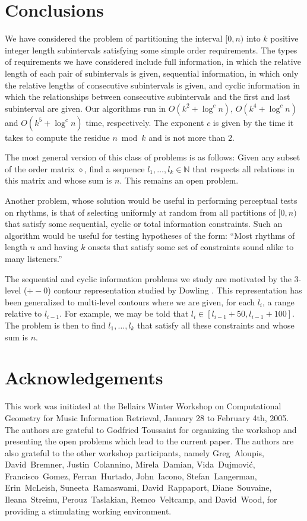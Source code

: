 \documentclass[11pt]{patmorin}
\newcommand{\N}{\mathbb{N}}
\newcommand{\op}{\diamond}
\begin{document}
\section{Conclusions}

We have considered the problem of partitioning the interval $[0,n)$
into $k$ positive integer length subintervals satisfying some simple
order requirements.  The types of requirements we have considered
include full information, in which the relative length of each pair of
subintervals is given, sequential information, in which only the
relative lengths of consecutive subintervals is given, and cyclic
information in which the relationships between consecutive
subintervals and the first and last subinterval are given.  Our
algorithms run in $O(k^2+\log^c n)$, $O(k^4+\log^c n)$ and
$O(k^5+\log^cn)$ time, respectively. The exponent $c$ is given
by the time it takes to compute the residue $n\bmod k$ and is not more
than $2$.

The most general version of this class of problems is as follows:
Given any subset of the order matrix $\op$, find a sequence
$l_1,\ldots,l_k\in\N$ that respects all relations in this matrix and
whose sum is $n$. This remains an open problem.

Another problem, whose solution would be useful in performing
perceptual tests on rhythms, is that of selecting uniformly at random
from all partitions of $[0,n)$ that satisfy some sequential, cyclic or
total information constraints.  Such an algorithm would be useful for
testing hypotheses of the form:  ``Most rhythms of length $n$ and
having $k$ onsets that satisfy some set of constraints sound alike to
many listeners.''

The sequential and cyclic information problems we study are motivated
by the 3-level ($+-0$) contour representation studied by Dowling
\cite{d78}.  This representation has been generalized to multi-level
contours \cite{l96,kcgv00} where we are given, for each $l_i$, a range
relative to $l_{i-1}$.  For example, we may be told that $l_{i}\in
[l_{i-1} + 50, l_{i-1}+100]$.  The problem is then to find
$l_1,\ldots,l_k$ that satisfy all these constraints and whose sum is
$n$.

\section*{Acknowledgements}

This work was initiated at the Bellairs Winter Workshop on
Computational Geometry for Music Information Retrieval, January 28 to
February 4th, 2005.  The authors are grateful to Godfried Toussaint
for organizing the workshop and presenting the open problems which
lead to the current paper.  The authors are also grateful to the other
workshop participants, namely 
Greg~Aloupis,
David~Bremner,
Justin~Colannino,
Mirela~Damian, 
Vida~Dujmovi\'c,
Francisco~Gomez,
Ferran~Hurtado, 
John~Iacono,
Stefan~Langerman,
Erin~McLeish,
Suneeta~Ramaswami,
David~Rappaport,
Diane~Souvaine,
Ileana~Streinu,
Perouz~Taslakian,
Remco~Veltcamp,
and David~Wood,
for providing a
stimulating working environment.



\end{document}
